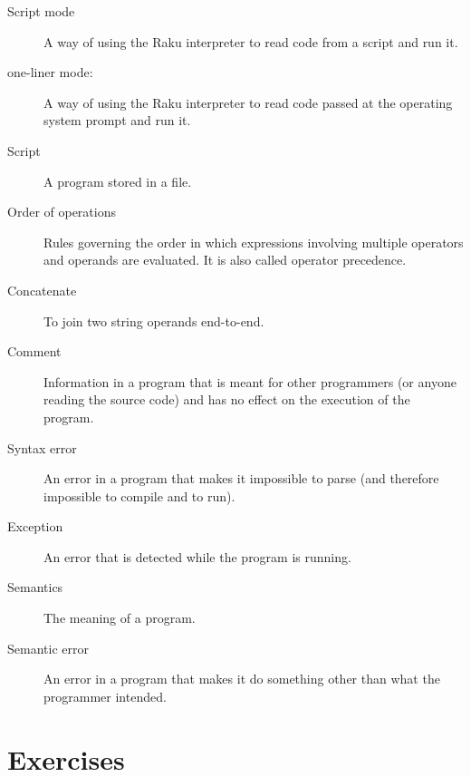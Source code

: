 \begin{description}
\item[Script mode] A way of using the Raku interpreter to read
code from a script and run it.

\item[one-liner mode:] A way of using the Raku interpreter to read
code passed at the operating system prompt and run it.

\item[Script] A program stored in a file.

\item[Order of operations]  Rules governing the order in which
expressions involving multiple operators and operands are evaluated.
It is also called operator precedence.

\item[Concatenate]  To join two string operands end-to-end.

\item[Comment]  Information in a program that is meant for other
programmers (or anyone reading the source code) and has no effect on the
execution of the program.

\item[Syntax error]  An error in a program that makes it impossible
to parse (and therefore impossible to compile and to run).

\item[Exception]  An error that is detected while the program is running.

\item[Semantics]  The meaning of a program.

\item[Semantic error]   An error in a program that makes it do something
other than what the programmer intended.

\end{description}


\section{Exercises}

